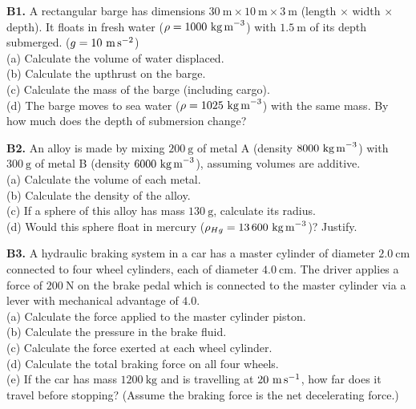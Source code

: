 \begin{exercisebox}[11]
\textbf{B1.} A rectangular barge has dimensions
$30\ \text{m} \times 10\ \text{m} \times 3\ \text{m}$
(length $\times$ width $\times$ depth). It floats
in fresh water ($\rho = 1000\ \text{kg\,m}^{-3}$)
with $1.5\ \text{m}$ of its depth submerged.
($g = 10\ \text{m\,s}^{-2}$)\\[4pt]
(a) Calculate the volume of water displaced.\\
(b) Calculate the upthrust on the barge.\\
(c) Calculate the mass of the barge (including cargo).\\
(d) The barge moves to sea water
($\rho = 1025\ \text{kg\,m}^{-3}$) with the same mass.
By how much does the depth of submersion change?
\hfill{}

\vspace{0.4cm}

\textbf{B2.} An alloy is made by mixing
$200\ \text{g}$ of metal A (density
$8000\ \text{kg\,m}^{-3}$) with $300\ \text{g}$
of metal B (density $6000\ \text{kg\,m}^{-3}$),
assuming volumes are additive.\\[4pt]
(a) Calculate the volume of each metal.\\
(b) Calculate the density of the alloy.\\
(c) If a sphere of this alloy has mass $130\ \text{g}$,
calculate its radius.\\
(d) Would this sphere float in mercury
($\rho_{Hg} = 13\,600\ \text{kg\,m}^{-3}$)? Justify.
\hfill{}

\vspace{0.4cm}

\textbf{B3.} A hydraulic braking system in a car has
a master cylinder of diameter $2.0\ \text{cm}$ connected
to four wheel cylinders, each of diameter $4.0\ \text{cm}$.
The driver applies a force of $200\ \text{N}$ on the
brake pedal which is connected to the master cylinder
via a lever with mechanical advantage of $4.0$.\\[4pt]
(a) Calculate the force applied to the master cylinder piston.\\
(b) Calculate the pressure in the brake fluid.\\
(c) Calculate the force exerted at each wheel cylinder.\\
(d) Calculate the total braking force on all four wheels.\\
(e) If the car has mass $1200\ \text{kg}$ and is
travelling at $20\ \text{m\,s}^{-1}$, how far does
it travel before stopping? (Assume the braking force
is the net decelerating force.)
\hfill{}


\end{exercisebox}

